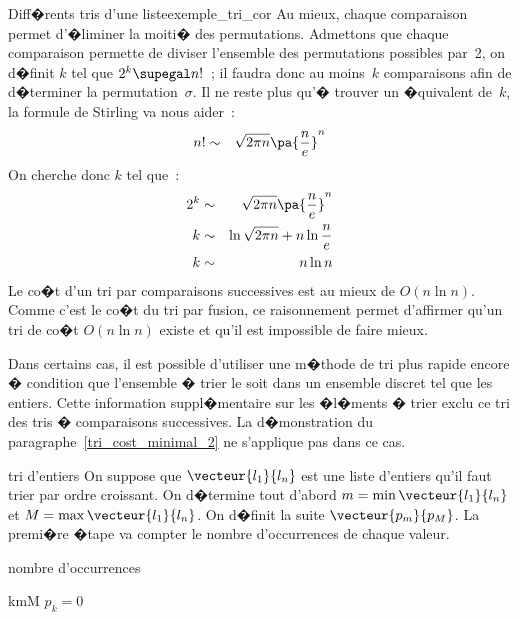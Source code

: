 \begin{xexempleprog2}{Diff�rents tris d'une liste}{exemple_tri_cor}
Au mieux, chaque comparaison permet d'�liminer la moiti� des permutations. Admettons que chaque comparaison permette de diviser l'ensemble des permutations possibles par~2, on d�finit $k$ tel que $2^k \supegal n!$~; il faudra donc au moins~$k$ comparaisons afin de d�terminer la permutation~$\sigma$.  Il ne reste plus qu'� trouver un �quivalent de~$k$, la formule de Stirling va nous aider~:
\begin{eqnarray}
n! &\sim& \sqrt{2 \pi n} \pa{\frac{n}{e}}^n
\end{eqnarray}
%
On cherche donc $k$ tel que~:
\begin{eqnarray}
2^k &\sim& \sqrt{2 \pi n} \pa{\frac{n}{e}}^n \nonumber \\
  k &\sim& \ln \sqrt{2 \pi n} + n \ln \frac{n}{e} \\
  k &\sim&  n \ln n 
\end{eqnarray}
%
Le co�t d'un tri par comparaisons successives est au mieux de $O(n\ln n)$. Comme c'est le co�t du tri par fusion, ce raisonnement permet d'affirmer qu'un tri de co�t $O(n \ln n)$ existe et qu'il est impossible de faire mieux.


\label{par_tri_entiers}

Dans certains cas, il est possible d'utiliser une m�thode de tri plus rapide encore � condition que l'ensemble � trier le soit dans un ensemble discret tel que les entiers. Cette information suppl�mentaire sur les �l�ments � trier exclu ce tri des tris � comparaisons successives. La d�monstration du paragraphe~\ref{tri_cost_minimal_2} ne s'applique pas dans ce cas.



            \begin{xalgorithm}{tri d'entiers}
            On suppose que $\vecteur{l_1}{l_n}$ est une liste d'entiers qu'il faut trier par ordre croissant. 
            On d�termine tout d'abord $m = \min\vecteur{l_1}{l_n}$ et $M = \max\vecteur{l_1}{l_n}$. On d�finit
            la suite $\vecteur{p_m}{p_M}$. La premi�re �tape va compter le nombre d'occurrences de chaque valeur.

            \begin{xalgostep}{nombre d'occurrences}\label{tri_entier_occ}
            \begin{xfor2}{k}{m}{M}
                $p_k = 0$
            \end{xfor2}
            

\end{xalgostep}
\end{xalgorithm}
\end{xexempleprog2}
